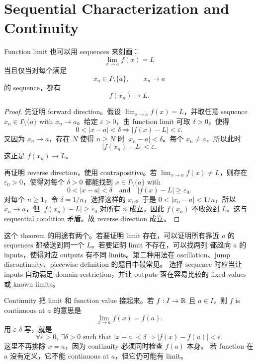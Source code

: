 \section{Sequential Characterization and Continuity}

\begin{theorem}
Function limit 也可以用 sequences 来刻画：
\[
  \lim_{x\to a}f(x)=L
\]
当且仅当对每个满足
\[
  x_n\in I\setminus\{a\},\qquad x_n\to a
\]
的 sequence，都有
\[
  f(x_n)\to L.
\]
\end{theorem}

\begin{proof}
先证明 forward direction。假设 \(\lim_{x\to a}f(x)=L\)，并取任意
sequence \(x_n\in I\setminus\{a\}\) with \(x_n\to a\)。给定
\(\varepsilon>0\)，由 function limit 可取 \(\delta>0\)，使得
\[
  0<|x-a|<\delta \Longrightarrow |f(x)-L|<\varepsilon.
\]
又因为 \(x_n\to a\)，存在 \(N\) 使得 \(n\geq N\) 时
\(|x_n-a|<\delta\)。每个 \(x_n\neq a\)，所以此时
\[
  |f(x_n)-L|<\varepsilon.
\]
这正是 \(f(x_n)\to L\)。

再证明 reverse direction，使用 contrapositive。若
\(\lim_{x\to a}f(x)\neq L\)，则存在 \(\varepsilon_0>0\)，使得对每个
\(\delta>0\) 都能找到 \(x\in I\setminus\{a\}\) with
\[
  0<|x-a|<\delta
  \quad\text{and}\quad
  |f(x)-L|\geq\varepsilon_0.
\]
对每个 \(n\geq1\)，令 \(\delta=1/n\)，选择这样的 \(x_n\)。于是
\(0<|x_n-a|<1/n\)，所以 \(x_n\to a\)，但
\(|f(x_n)-L|\geq\varepsilon_0\) 对所有 \(n\) 成立，因此
\(f(x_n)\) 不收敛到 \(L\)。这与 sequential condition 矛盾。故 reverse
direction 成立。
\end{proof}

这个 theorem 的用途有两个。若要证明 limit 存在，可以证明所有靠近
\(a\) 的 sequences 都被送到同一个 \(L\)。若要证明 limit 不存在，可以找两列
都趋向 \(a\) 的 inputs，使得对应 outputs 有不同 limits。第二种用法在
oscillation、jump discontinuity、piecewise definition 的题目中最常见。
选择 sequence 时应当让 inputs 自动满足 domain restriction，并让 outputs
落在容易比较的 fixed values 或 known limits。

Continuity 把 limit 和 function value 接起来。若 \(f:I\to\mathbb{R}\) 且
\(a\in I\)，则 \(f\) is continuous at \(a\) 的意思是
\[
  \lim_{x\to a}f(x)=f(a).
\]
用 \(\varepsilon\)-\(\delta\) 写，就是
\[
  \forall\varepsilon>0,\ \exists\delta>0
  \text{ such that }
  |x-a|<\delta \Longrightarrow |f(x)-f(a)|<\varepsilon.
\]
这里不再排除 \(x=a\)，因为 continuity 必须同时检查 \(f(a)\) 本身。
若 function 在 \(a\) 没有定义，它不能 continuous at \(a\)，但它仍可能有
limit。

